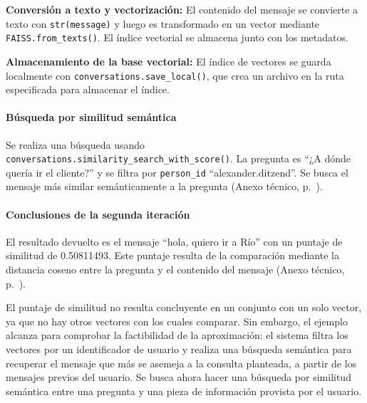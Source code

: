 \textbf{Conversión a texto y vectorización:} El contenido del mensaje se convierte a texto con \texttt{str(message)} y luego es transformado en un vector mediante \texttt{FAISS.from\_texts()}. El índice vectorial se almacena junto con los metadatos.

\textbf{Almacenamiento de la base vectorial:} El índice de vectores se guarda localmente con \texttt{conversations.save\_local()}, que crea un archivo en la ruta especificada para almacenar el índice.

\paragraph{Búsqueda por similitud semántica}

Se realiza una búsqueda usando \texttt{conversations.similarity\_search\_with\_score()}. La pregunta es ``¿A dónde quería ir el cliente?'' y se filtra por \texttt{person\_id} ``alexander.ditzend''. Se busca el mensaje más similar semánticamente a la pregunta (Anexo técnico, p.~\pageref{anexo:code-4-1-2-1}).

\paragraph{Conclusiones de la segunda iteración}

El resultado devuelto es el mensaje ``hola, quiero ir a Río'' con un puntaje de similitud de 0.50811493. Este puntaje resulta de la comparación mediante la distancia coseno entre la pregunta y el contenido del mensaje (Anexo técnico, p.~\pageref{anexo:code-4-1-2-2}).

El puntaje de similitud no resulta concluyente en un conjunto con un solo vector, ya que no hay otros vectores con los cuales comparar. Sin embargo, el ejemplo alcanza para comprobar la factibilidad de la aproximación: el sistema filtra los vectores por un identificador de usuario y realiza una búsqueda semántica para recuperar el mensaje que más se asemeja a la consulta planteada, a partir de los mensajes previos del usuario. Se busca ahora hacer una búsqueda por similitud semántica entre una pregunta y una pieza de información provista por el usuario.